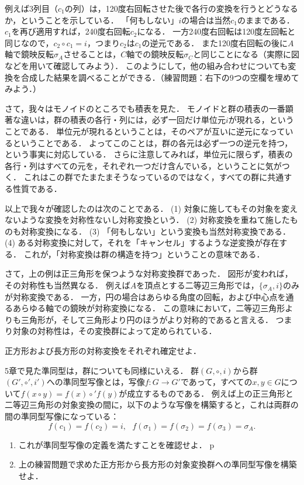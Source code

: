 \documentclass[11pt,a4paper]{jsarticle}
\begin{document}
例えば3列目（$c_1$の列）は，120度右回転させた後で各行の変換を行うとどうなるか，ということを示している．
「何もしない」$i$の場合は当然$c_1$のままである．
$c_1$を再び適用すれば，240度右回転$c_2$になる．
一方240度右回転は120度左回転と同じなので，$c_2 \circ c_1 = i$，つまり$c_2$は$c_1$の逆元である．
また120度右回転の後に$A$軸で鏡映反転$\sigma_A$させることは，$C$軸での鏡映反転$\sigma_C$と同じことになる（実際に図などを用いて確認してみよう）．
このようにして，他の組み合わせについても変換を合成した結果を調べることができる．（練習問題：右下の9つの空欄を埋めてみよう．）

さて，我々はモノイドのところでも積表を見た．
モノイドと群の積表の一番顕著な違いは，群の積表の各行・列には，必ず一回だけ単位元$i$が現れる，ということである．
単位元が現れるということは，そのペアが互いに逆元になっているということである．
よってこのことは，群の各元は必ず一つの逆元を持つ，という事実に対応している．
さらに注意してみれば，単位元に限らず，積表の各行・列はすべての元を，それぞれ一つだけ含んでいる，ということに気がつく．
これはこの群でたまたまそうなっているのではなく，すべての群に共通する性質である．

以上で我々が確認したのは次のことである．
(1) 対象に施してもその対象を変えないような変換を対称性ないし対称変換という．
(2) 対称変換を重ねて施したものも対称変換になる．
(3) 「何もしない」という変換も当然対称変換である．
(4) ある対称変換に対して，それを「キャンセル」するような逆変換が存在する．
これが，「対称変換は群の構造を持つ」ということの意味である．

さて，上の例は正三角形を保つような対称変換群であった．
図形が変われば，その対称性も当然異なる．
例えば$A$を頂点とする二等辺三角形では，$\{ \sigma_A, i\}$のみが対称変換である．
一方，円の場合はあらゆる角度の回転，および中心点を通るあらゆる軸での鏡映が対称変換になる．
この意味において，二等辺三角形よりも三角形が，そして三角形より円のほうがより対称的であると言える．
つまり対象の対称性は，その変換群によって定められている．

\begin{exercise}
    正方形および長方形の対称変換をそれぞれ確定せよ．
\end{exercise}

\begin{exercise}
    5章で見た準同型は，群についても同様にいえる．
    群$(G, \circ, i)$から群$(G', \circ', i')$への準同型写像とは，写像$f:G \to G'$であって，すべての$x, y \in G$について$f(x\circ y) = f(x) \circ' f(y)$が成立するものである．
    例えば上の正三角形と二等辺三角形の対象変換の間に，以下のような写像を構築すると，これは両群の間の準同型写像になっている：
    \[
    f(c_1)=f(c_2)=i, \ \ \ f(\sigma_1) = f(\sigma_2) = f(\sigma_3) = \sigma_A.    
    \]
    \begin{enumerate}
        \item これが準同型写像の定義を満たすことを確認せよ．
p        \item 上の練習問題で求めた正方形から長方形の対象変換群への準同型写像を構築せよ．
    \end{enumerate}
\end{exercise}
\end{document}
